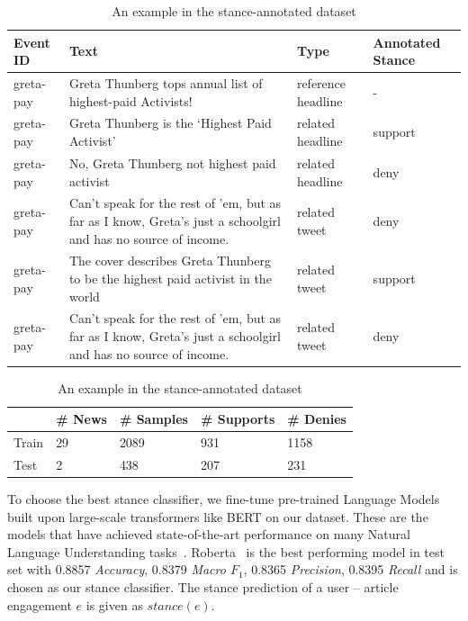 \documentclass[fyp]{socreport}
\theoremstyle{definition}
\theoremstyle{hypothesis}
\begin{document}
\begin{table}[t]
  \centering
  \small
  \begin{tabular}{|p{2cm}|p{7.25cm}|p{2.75cm}|p{2cm}|}
  \hline
    Event ID & Text & Type & Annotated Stance \\ \hline \hline
  greta-pay & Greta Thunberg tops annual list of highest-paid Activists! & reference headline & - \\ \hline
  greta-pay & Greta Thunberg is the ‘Highest Paid Activist’ & related headline & support \\ \hline
  greta-pay & No, Greta Thunberg not highest paid activist & related headline & deny \\ \hline
  greta-pay & Can't speak for the rest of 'em, but as far as I know, Greta's just a schoolgirl and has no source of income. & related tweet & deny \\ \hline
  greta-pay & The cover describes Greta Thunberg to be the highest paid activist in the world & related tweet & support \\ \hline
  greta-pay & Can't speak for the rest of 'em, but as far as I know, Greta's just a schoolgirl and has no source of income. & related tweet & deny \\ \hline
  \end{tabular}
  \caption{An example in the stance-annotated dataset}
  \label{table:stance_annotation}
\end{table}

\begin{table}[t]
  \centering
  \small
  \begin{tabular}{|p{2cm}|p{2cm}|p{2cm}|p{2cm}|p{2cm}|}
  \hline
    & \# News & \# Samples & \# Supports & \# Denies \\ \hline \hline
  Train & 29 & 2089 & 931 & 1158 \\ \hline
  Test & 2 & 438 & 207 & 231 \\ \hline
  \end{tabular}
  \caption{An example in the stance-annotated dataset}
  \label{table:stance_statistics}
\end{table}

To choose the best stance classifier, we fine-tune pre-trained Language Models built upon large-scale transformers like BERT on our dataset. These are the models that have achieved state-of-the-art performance on many Natural Language Understanding tasks~\cite{wang-etal-2018-glue}. Roberta~\cite{liu2019roberta} is the best performing model in test set with 0.8857 \textit{Accuracy}, 0.8379 \textit{Macro $F_1$}, 0.8365 \textit{Precision}, 0.8395 \textit{Recall} and is chosen as our stance classifier. The stance prediction of a user -- article engagement $e$ is given as $stance(e)$.
\end{document}

